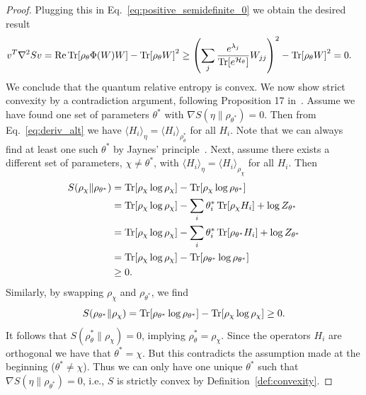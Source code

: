 \documentclass[
    reprint,
    aps,
    prx,
    longbibliography
]{revtex4-2}
\begin{document}
\begin{proof}
Plugging this in Eq.~\eqref{eq:positive_semidefinite_0} we obtain the desired result
\begin{align}
\label{eq:positive_semidefinite}
    v^T \nabla^2 S v &= \Re \Tr[\rho_\theta \Phi(W) W ] - \Tr[ \rho_\theta W]^2 
    \geq \left( \sum_{j} \frac{e^{\lambda_j}}{\Tr[e^{\mathcal{H}_{\theta}}]} W_{jj} \right)^2 - \Tr[ \rho_\theta W]^2 = 0 .
\end{align}
We conclude that the quantum relative entropy is convex. We now show strict convexity by a contradiction argument, following Proposition 17 in~\cite{Anshu_2021}. Assume we have found one set of parameters $\theta^*$ with $\nabla S(\eta \|\rho_{\theta^*})=0$. Then from Eq.~\eqref{eq:deriv_alt} we have $\langle H_{i}\rangle_\eta =\langle H_{i} \rangle_{\rho_\theta^*}$ for all $H_{i}$. Note that we can always find at least one such $\theta^*$ by Jaynes' principle~\cite{jaynes1957}. Next, assume there exists a different set of parameters, $\chi\neq\theta^*$, with $\langle H_{i}\rangle_\eta =\langle H_{i} \rangle_{\rho_\chi}$ for all $H_{i}$. Then
\begin{align}
\begin{split}
S(\rho_\chi \| \rho_{\theta^*}) &= \Tr[ \rho_\chi\log{\rho_\chi} ]-\Tr[ \rho_\chi\log{\rho_{\theta^*}} ] \\
&= \Tr[\rho_\chi\log{\rho_\chi}] - \sum_{i}\theta^*_{i}\Tr[\rho_\chi H_{i}] +\log{Z_{\theta^*}} \\
&= \Tr[\rho_\chi\log{\rho_\chi}] - \sum_{i}\theta^*_{i}\Tr[\rho_{\theta^*} H_{i}] +\log{Z_{\theta^*}} \\
&= \Tr[\rho_\chi\log{\rho_\chi}] - \Tr[\rho_{\theta^*}\log{\rho_{\theta^*}}] \\
&\geq 0. 
\end{split}
\end{align} 
Similarly, by swapping $\rho_\chi$ and $\rho_{\theta^*}$, we find \begin{equation}
S(\rho_{\theta^*}\|\rho_\chi) = \Tr[\rho_{\theta^*}\log{\rho_{\theta^*}}] - \Tr[\rho_\chi\log{\rho_\chi}] \geq 0.
\end{equation} 
It follows that $S(\rho_\theta^*\|\rho_\chi)=0$, implying $\rho_\theta^* = \rho_\chi$. Since the operators $H_{i}$ are orthogonal we have that $\theta^*=\chi$. But this contradicts the assumption made at the beginning ($\theta^*\neq\chi$). Thus we can only have one unique $\theta^*$ such that $\nabla S(\eta \|\rho_{\theta^*})=0$, i.e., $S$ is strictly convex by Definition~\ref{def:convexity}.
\end{proof}
\end{document}
